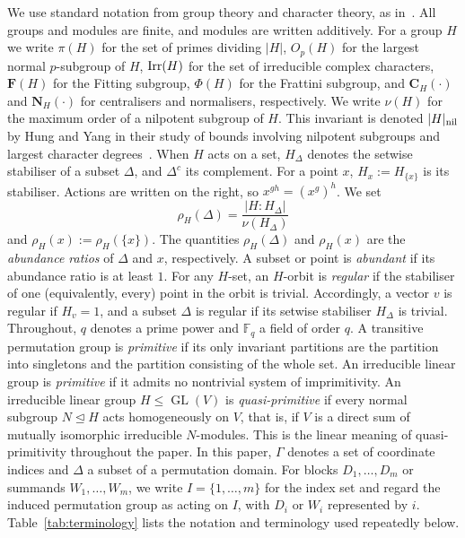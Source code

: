 \documentclass[10pt]{amsart}
\theoremstyle{definition}
\renewcommand{\leq}{\leqslant}
\DeclareMathOperator{\GL}{GL}
\numberwithin{equation}{section}
\numberwithin{table}{section}
\begin{document}
 We use standard notation from group
theory and character theory, as in~\cite{Isa76}. All groups and modules are
finite, and modules are written additively. For a group $H$ we write $\pi(H)$ for the set of primes dividing $|H|$, $O_p(H)$ for the largest normal $p$-subgroup of $H$, ${\rm Irr}(H)$ for the set of irreducible complex characters, $\mathbf{F}(H)$ for the Fitting subgroup, $\Phi(H)$ for the Frattini subgroup, and $\mathbf{C}_H(\cdot)$ and $\mathbf{N}_H(\cdot)$ for centralisers and normalisers, respectively. We write $\nu(H)$ for the maximum order of a nilpotent subgroup of $H$. This invariant is denoted $|H|_{\rm nil}$ by Hung and Yang in their study of bounds involving nilpotent subgroups and largest character degrees~\cite{HungYang20}. When $H$ acts on a set, $H_\Delta$ denotes the setwise stabiliser of a subset $\Delta$, and $\Delta^{c}$ its complement. For a point $x$, $H_x:=H_{\{x\}}$ is its stabiliser. Actions are written on the right, so $x^{gh}=(x^g)^h$. We set $$\rho_H(\Delta)=\frac{|H:H_\Delta|}{\nu(H_\Delta)}$$ and $\rho_H(x):=\rho_H(\{x\})$. The quantities $\rho_H(\Delta)$ and $\rho_H(x)$ are the \emph{abundance ratios} of $\Delta$ and $x$, respectively. A subset or point is \emph{abundant} if its abundance ratio is at least $1$. For any $H$-set, an $H$-orbit is \emph{regular} if the stabiliser of one (equivalently, every) point in the orbit is trivial. Accordingly, a vector $v$ is regular if $H_v=1$, and a subset $\Delta$ is regular if its setwise stabiliser $H_\Delta$ is trivial. Throughout, $q$ denotes a prime power and $\mathbb{F}_q$ a field of order $q$. A transitive permutation group is \emph{primitive} if its only invariant partitions are the partition into singletons and the partition consisting of the whole set. An irreducible linear group is {\it primitive} if it admits no nontrivial system of imprimitivity. An irreducible linear group $H\leq\GL(V)$ is {\it quasi-primitive} if every normal subgroup $N\trianglelefteq
H$ acts homogeneously on $V$, that is, if $V$ is a direct sum of mutually
isomorphic irreducible $N$-modules. This is the linear
meaning of quasi-primitivity throughout the paper. In this paper, $\Gamma$
denotes a set of coordinate indices and $\Delta$ a subset of a permutation
domain. For blocks $D_1,\ldots,D_m$ or summands $W_1,\ldots,W_m$, we write
$I=\{1,\ldots,m\}$ for the index set and regard the induced permutation group
as acting on $I$, with $D_i$ or $W_i$ represented by $i$.
Table~\ref{tab:terminology} lists the notation and terminology used repeatedly
below.
\end{document}
